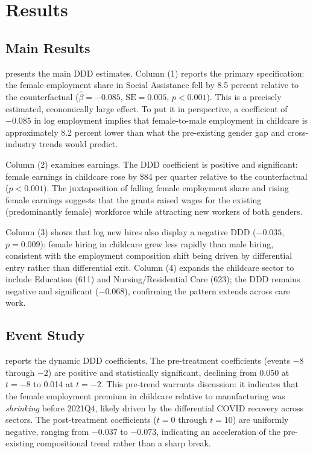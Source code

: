 \documentclass[12pt]{article}
\begin{document}
\section{Results}

\subsection{Main Results}



 presents the main DDD estimates. Column (1) reports the primary specification: the female employment share in Social Assistance fell by 8.5 percent relative to the counterfactual ($\hat{\beta} = -0.085$, $\text{SE} = 0.005$, $p < 0.001$). This is a precisely estimated, economically large effect. To put it in perspective, a coefficient of $-0.085$ in log employment implies that female-to-male employment in childcare is approximately 8.2 percent lower than what the pre-existing gender gap and cross-industry trends would predict.

Column (2) examines earnings. The DDD coefficient is positive and significant: female earnings in childcare rose by \$84 per quarter relative to the counterfactual ($p < 0.001$). The juxtaposition of falling female employment share and rising female earnings suggests that the grants raised wages for the existing (predominantly female) workforce while attracting new workers of both genders.

Column (3) shows that log new hires also display a negative DDD ($-0.035$, $p = 0.009$): female hiring in childcare grew less rapidly than male hiring, consistent with the employment composition shift being driven by differential entry rather than differential exit. Column (4) expands the childcare sector to include Education (611) and Nursing/Residential Care (623); the DDD remains negative and significant ($-0.068$), confirming the pattern extends across care work.

\subsection{Event Study}



 reports the dynamic DDD coefficients. The pre-treatment coefficients (events $-8$ through $-2$) are positive and statistically significant, declining from 0.050 at $t = -8$ to 0.014 at $t = -2$. This pre-trend warrants discussion: it indicates that the female employment premium in childcare relative to manufacturing was \emph{shrinking} before 2021Q4, likely driven by the differential COVID recovery across sectors. The post-treatment coefficients ($t = 0$ through $t = 10$) are uniformly negative, ranging from $-0.037$ to $-0.073$, indicating an acceleration of the pre-existing compositional trend rather than a sharp break.
\end{document}
